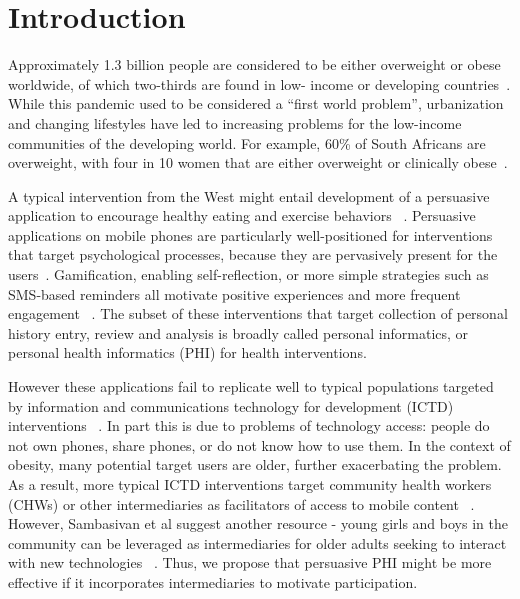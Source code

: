 \documentclass{sig-alternate}
\begin{document}
%
%

%
%
\printccsdesc



\section{Introduction} Approximately 1.3 billion people are considered to be
either overweight or obese worldwide, of which two-thirds are found in low-
income or developing countries~\cite{Steyn2006}. While this pandemic used to
be considered a ``first world problem'', urbanization and changing lifestyles
have led to increasing problems for the low-income communities of the
developing world. For example, 60\% of South Africans are overweight, with
four in 10 women that are either overweight or clinically
obese~\cite{ng:global}.

A typical intervention from the West might entail development of a persuasive
application to encourage healthy eating and exercise behaviors
~\cite{arsand:mobile,hamari2014persuasive}. Persuasive applications on mobile
phones are particularly well-positioned for interventions that target
psychological processes, because they are pervasively present for the users~\cite{hsu2014persuasive}. Gamification, enabling self-reflection, or more
simple strategies such as SMS-based reminders all motivate positive
experiences and more frequent engagement
~\cite{cole2010text,hamari2014persuasive}. The subset of these interventions
that target collection of personal history entry, review and analysis is
broadly called personal informatics, or personal health informatics (PHI) for
health interventions.

However these applications fail to replicate well to typical populations
targeted by information and communications technology for development (ICTD)
interventions ~\cite{kaplan2006can}. In part this is due to problems of
technology access: people do not own phones, share phones, or do not know how
to use them.  In the context of obesity, many potential target users are
older, further exacerbating the problem. As a result, more typical ICTD
interventions target community health workers (CHWs) or other intermediaries
as facilitators of access to mobile content
~\cite{ramachandran2010mobile,ramachandran2010research,molapo2013software}.
However, Sambasivan et al suggest another resource - young girls and boys in
the community can be leveraged as intermediaries for older adults seeking to
interact with new technologies ~\cite{sambasivan2010}. Thus, we propose that
persuasive PHI might be more effective if it incorporates intermediaries to
motivate participation.
\end{document}
